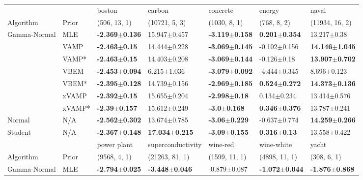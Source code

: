 \begin{tabular}{lllllll}
\toprule
        &     &                     boston &                     carbon &                   concrete &                    energy &                      naval \\
Algorithm & Prior& (506, 13, 1)& (10721, 5, 3)& (1030, 8, 1)& (768, 8, 2)& (11934, 16, 2)\\
\midrule
Gamma-Normal & MLE &  \textbf{-2.369$\pm$0.136} &           15.947$\pm$0.457 &  \textbf{-3.119$\pm$0.158} &  \textbf{0.201$\pm$0.354} &            13.217$\pm$0.38 \\
        & VAMP &   \textbf{-2.463$\pm$0.15} &           14.444$\pm$0.228 &  \textbf{-3.069$\pm$0.145} &          -0.102$\pm$0.156 &  \textbf{14.146$\pm$1.045} \\
        & VAMP* &   \textbf{-2.463$\pm$0.15} &           14.403$\pm$0.208 &  \textbf{-3.069$\pm$0.144} &           -0.126$\pm$0.18 &  \textbf{13.907$\pm$0.702} \\
        & VBEM &  \textbf{-2.453$\pm$0.094} &            6.215$\pm$1.036 &  \textbf{-3.079$\pm$0.092} &          -4.444$\pm$0.345 &            8.696$\pm$0.123 \\
        & VBEM* &  \textbf{-2.395$\pm$0.128} &           14.739$\pm$0.156 &  \textbf{-2.969$\pm$0.185} &  \textbf{0.524$\pm$0.272} &  \textbf{14.373$\pm$0.136} \\
        & xVAMP &   \textbf{-2.392$\pm$0.15} &           15.655$\pm$0.204 &   \textbf{-2.998$\pm$0.18} &           0.134$\pm$0.234 &           13.414$\pm$0.576 \\
        & xVAMP* &   \textbf{-2.39$\pm$0.157} &           15.612$\pm$0.249 &    \textbf{-3.0$\pm$0.168} &  \textbf{0.346$\pm$0.376} &           13.787$\pm$0.241 \\
Normal & N/A &  \textbf{-2.562$\pm$0.302} &           13.674$\pm$0.785 &   \textbf{-3.06$\pm$0.229} &          -0.637$\pm$0.774 &  \textbf{14.259$\pm$0.266} \\
Student & N/A &  \textbf{-2.367$\pm$0.148} &  \textbf{17.034$\pm$0.215} &   \textbf{-3.09$\pm$0.155} &   \textbf{0.316$\pm$0.13} &           13.558$\pm$0.422 \\
\midrule
        &     &                power plant &          superconductivity &                   wine-red &                 wine-white &                      yacht \\
Algorithm & Prior& (9568, 4, 1)& (21263, 81, 1)& (1599, 11, 1)& (4898, 11, 1)& (308, 6, 1)\\
\midrule
Gamma-Normal & MLE &  \textbf{-2.794$\pm$0.025} &  \textbf{-3.448$\pm$0.046} &           -0.879$\pm$0.087 &  \textbf{-1.072$\pm$0.044} &  \textbf{-1.876$\pm$0.868} \\

\end{tabular}
